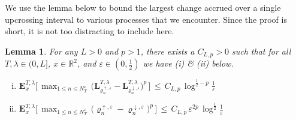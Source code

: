\documentclass[10pt]{article}
\numberwithin{equation}{section}
\newtheorem{lemma}[theorem]{Lemma}
\theoremstyle{definition}
\newcommand{\R}{{\mathbb R}}
\begin{document}
We use the  lemma below to bound the largest change accrued over a single upcrossing interval to various processes that we encounter.  Since the proof is short, it is not too distracting to include here.
\begin{lemma}\label{LemmaSupTime}  For any $ L>0$ and $p>1$, there exists a $C_{L,p}>0$ such that for all $T,\lambda \in (0, L]$, $x\in \R^2$, and $\varepsilon\in (0,\frac{1}{2})$ we have (i) \& (ii) below. 
\begin{enumerate}[(i)]

\item $\mathbf{E}^{T,\lambda}_{x}\Big[\,\max_{1\leq n \leq N_T^{\varepsilon} }\,\big( \mathbf{L}_{\varrho_{n}^{\uparrow ,\varepsilon}}^{T,\lambda}- \mathbf{L}_{\varrho_{n}^{\downarrow ,\varepsilon}}^{T,\lambda} \big)^p \,\Big] \,\leq\, C_{L,p} \,\log^{\frac{1}{2}-p}\frac{1}{\varepsilon}  $

\item $\mathbf{E}^{T,\lambda}_{x}\Big[\,\max_{1\leq n \leq N_T^{\varepsilon} }\,\big( \varrho_{n}^{\uparrow ,\varepsilon}- \varrho_{n}^{\downarrow ,\varepsilon} \big)^p\, \Big] \,\leq\, C_{L,p}\, \varepsilon^{2p}\,\log^{\frac{1}{2}} \frac{1}{\varepsilon}  $
    
\end{enumerate}

\end{lemma}
\end{document}
